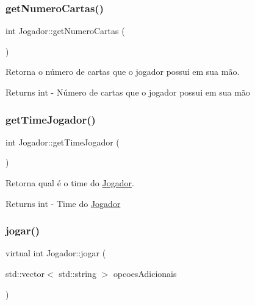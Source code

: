 \subsubsection{\texorpdfstring{getNumeroCartas()}{getNumeroCartas()}}
{\footnotesize\ttfamily int Jogador\+::get\+Numero\+Cartas (\begin{DoxyParamCaption}{ }\end{DoxyParamCaption})}



Retorna o número de cartas que o jogador possui em sua mão. 

\begin{DoxyReturn}{Returns}
int -\/ Número de cartas que o jogador possui em sua mão 
\end{DoxyReturn}
\mbox{\label{class_jogador_a6445980bae531aaca239735557140ffa}} 
\subsubsection{\texorpdfstring{getTimeJogador()}{getTimeJogador()}}
{\footnotesize\ttfamily int Jogador\+::get\+Time\+Jogador (\begin{DoxyParamCaption}{ }\end{DoxyParamCaption})}



Retorna qual é o time do \mbox{\hyperlink{class_jogador}{Jogador}}. 

\begin{DoxyReturn}{Returns}
int -\/ Time do \mbox{\hyperlink{class_jogador}{Jogador}} 
\end{DoxyReturn}
\mbox{\label{class_jogador_a8af760d8531f7d4e78fc767adcff0cb6}} 
\subsubsection{\texorpdfstring{jogar()}{jogar()}}
{\footnotesize\ttfamily virtual int Jogador\+::jogar (\begin{DoxyParamCaption}\item[{std\+::vector$<$ std\+::string $>$}]{opcoes\+Adicionais }\end{DoxyParamCaption})\hspace{0.3cm}{\ttfamily [pure virtual]}}



